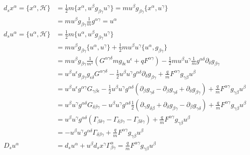 \documentclass[11pt]{article}
\begin{document}
\begin{equation}
\begin{aligned}
d_s x^\alpha = \{x^\alpha, \mathcal{H}\} &= \frac{1}{2} m  \{x^\alpha, u^\beta g_{\beta\gamma} u^\gamma\} = m u^\beta g_{\beta \gamma} \{x^\alpha, u^\gamma\}\\
&= m u^\beta g_{\beta\gamma} \frac{1}{m} g^{\alpha\gamma} = u^\alpha \\
d_s u^\alpha = \{ u^\alpha , \mathcal{H} \} &= \frac{1}{2} m \{u^\alpha, u^\beta g_{\beta\gamma} u^\gamma\} \\
&=  m u^\beta g_{\beta\gamma} \{u^\alpha,  u^\gamma\} + \frac{1}{2} m u^\beta u^\gamma \{u^\alpha,  g_{\beta\gamma} \} \\
&= m u^\beta g_{\beta\gamma} \frac{1}{m^2} (G^{\alpha \gamma \delta} m g_{\delta \epsilon} u^\epsilon +  q F^{\alpha \gamma}) - \frac{1}{2} m u^\beta u^\gamma \frac{1}{m} g^{\alpha \delta} \partial_\delta g_{\beta\gamma} \\
&= u^\beta u^\epsilon g_{\beta\gamma} g_{\epsilon \delta} G^{\alpha \gamma \delta} - \frac{1}{2} u^\beta u^\gamma g^{\alpha \delta} \partial_\delta g_{\beta\gamma} + \frac{q}{m} F^{\alpha \gamma}g_{\gamma\beta}u^\beta \\
&= u^\beta u^\epsilon g^{\alpha\gamma} G_{\gamma \beta \epsilon} - \frac{1}{2} u^\beta u^\gamma g^{\alpha \delta} (\partial_\beta g_{\gamma\delta} - \partial_\beta g_{\gamma\delta} + \partial_\delta g_{\beta\gamma}) + \frac{q}{m} F^{\alpha \gamma}g_{\gamma\beta}u^\beta \\
&= u^\beta u^\gamma g^{\alpha\delta} G_{\delta \beta \gamma} -  u^\beta u^\gamma g^{\alpha \delta} \frac{1}{2} (\partial_\gamma g_{\delta\beta} + \partial_\delta g_{\beta\gamma} - \partial_\beta g_{\gamma\delta}) + \frac{q}{m} F^{\alpha \gamma}g_{\gamma\beta}u^\beta \\
&= u^\beta u^\gamma g^{\alpha\delta} (\Gamma_{\beta \delta \gamma} - \Gamma_{\delta \beta \gamma} - \Gamma_{\beta \delta \gamma}) + \frac{q}{m} F^{\alpha \gamma}g_{\gamma\beta}u^\beta \\
&= - u^\beta u^\gamma g^{\alpha\delta} \Gamma_{\delta \beta \gamma} + \frac{q}{m} F^{\alpha \gamma}g_{\gamma\beta}u^\beta \\
D_s u^\alpha &= d_s u^\alpha + u^\beta d_sx^\gamma \Gamma^\alpha_{\beta\gamma} = \frac{q}{m} F^{\alpha \gamma}g_{\gamma\beta}u^\beta \\
\end{aligned}
\end{equation}
\end{document}
